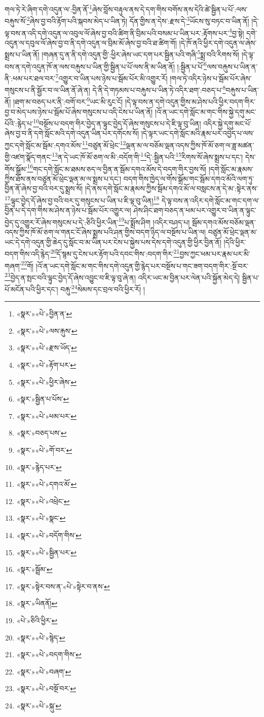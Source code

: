 གལ་ཏེ་རེ་ཞིག་དགེ་འདུན་ལ་:བྱིན་ནོ་\footnote{«སྣར་»«པེ་»བྱིན་ན་}ཞེས་བློས་བརྟུལ་ནས་དེ་དག་གིས་བགོས་ནས་དེའི་ཚེ་སྦྱིན་པ་པོ་:ལས་བརྐུས་སོ་\footnote{«སྣར་»«པེ་»ལས་རྐུས་}ཞེས་བྱ་བའི་རྟོག་པའི་སྐབས་མེད་པ་ཡིན་ཏེ། དོན་གྱིས་ན་དེས་:རྫས་དེ་\footnote{«སྣར་»«པེ་»རྫས་ཡོད་}ཡོངས་སུ་བཏང་བ་ཡིན་ནོ། །དེ་ལྟ་བས་ན་འདི་དགེ་འདུན་ལ་འབུལ་ལོ་ཞེས་བྱ་བའི་ཚིག་ནི་བྲིམ་པའི་བསམ་པ་ཡིན་པར་:རྟོགས་པར་\footnote{«སྣར་»«པེ་»རྟོག་པར་}བྱ་སྟེ། དགེ་འདུན་ལ་དབུལ་ལོ་ཞེས་བྱ་བ་ནི་དགེ་འདུན་ལ་བྲིམ་མོ་ཞེས་བྱ་བའི་ཐ་ཚིག་གོ། །དེ་ཁོ་ནའི་ཕྱིར་དགེ་འདུན་ལ་ཞེས་སྨྲས་པ་ཡིན་ནོ། །གཞན་དུ་ན་ནི་དགེ་འདུན་གྱི་:ཕྱིར་ཞེས་ཡང་དག་པར་སྦྱིན་པའི་གཞི་\footnote{«སྣར་»«པེ་»ཕྱིར་ཞེས་}སྨྲ་བའི་རིགས་སོ། །དེ་ལྟ་བས་ན་དགེ་འདུན་ཁོ་ན་ལས་བརྐུས་པ་ཡིན་གྱི་སྦྱིན་པ་པོ་ལས་ནི་མ་ཡིན་ནོ། །:སྦྱིན་པ་པོ་\footnote{«སྣར་»སྦྱིན་པ་པོས་}ལས་བརྐུས་པ་ཡིན་ན་ནི་:ཕམ་པར་ཐལ་བར་\footnote{«སྣར་»«པེ་»ཕམ་པར་}འགྱུར་བ་ཡིན་པས་ཉེས་པ་སྦོམ་པོར་མི་འགྱུར་རོ། །གལ་ཏེ་འདིར་ཉེས་པ་སྦོམ་པོར་ཞེས་གསུངས་པ་ནི་སྦྱོར་བ་ལ་ཡིན་ནོ་ཞེ་ན། དེ་ནི་དེ་གཏམས་པ་བརྐུས་པ་ཡིན་ཏེ་འདིར་ཐག་:བཅད་པ་\footnote{«སྣར་»བཅད་པས་}བརྐུས་པ་ཡིན་ནོ། །ཐག་མ་བཅད་པར་ནི་:བགོ་བར་\footnote{«སྣར་»«པེ་»གོ་བར་}ཡང་མི་རུང་ངོ། །དེ་ལྟ་བས་ན་དགེ་འདུན་གྱིས་མ་ཤེས་པའི་ཕྱིར་བདག་གིར་བྱ་བ་མེད་པས་ཉེས་པ་སྦོམ་པོ་ཞེས་གསུངས་པ་འདི་ངེས་པ་ཡིན་ནོ། །འོ་ན་ཡང་དགེ་སློང་མ་གང་གིས་སྐྱེ་དགུ་མང་པོའི་:རྙེད་པ་\footnote{«སྣར་»རྙེད་པར་}བསྔོས་པ་བདག་གིར་བྱེད་ན་ལྟུང་བྱེད་དོ་ཞེས་གསུངས་པ་དེ་ཇི་ལྟ་བུ་ཡིན། འདིར་སྐྱེ་དགུ་མང་པོ་ཞེས་བྱ་བ་ནི་དགེ་སློང་མའི་དགེ་འདུན་ཡིན་པར་དགོངས་སོ། །དེ་ལྟར་ཡང་དགེ་སློང་མའི་རྣམ་པར་འབྱེད་པ་ལས་ཀྱང་དགེ་སློང་མ་སྦོམ་:དགའ་མོས་\footnote{«སྣར་»«པེ་»དགའ་མོ་}བཙུན་མོ་ཕྲེང་\footnote{«སྣར་»«པེ་»འཕྲེང་}ལྡན་མ་ལ་བཅོམ་ལྡན་འདས་ཀྱིས་ཁོ་མོ་ཅག་ལ་ཟླ་མཚན་གྱི་འཛག་སྣོད་གནང་\footnote{«སྣར་»«པེ་»སྣང་}ན་དེ་ཡང་ཁོ་མོ་ཅག་ལ་མི་:བདོག་གི་\footnote{«སྣར་»«པེ་»བདོག་གིས་}དེ་:སྦྱིན་པའི་\footnote{«སྣར་»«པེ་»སྦྱིན་པར་}རིགས་སོ་ཞེས་སྨྲས་པ་དང་། དེས་གོས་སྒྲོམ་\footnote{«སྣར་»སྦྲོམ་}གང་དགེ་སློང་མ་ཐམས་ཅད་ལ་བྱིན་ན་སྦོམ་དགའ་མོས་དེ་བདག་གིར་བྱས་སོ། །དགེ་སློང་མ་རྣམས་ཀྱིས་ཐོས་ནས་བཙུན་མོ་ཕྲེང་ལྡན་མ་ལ་སྨྲས་པ་དང་། བདག་གིས་ཁྱེད་ལ་གོས་སྒྲོམ་གང་སྦོམ་དགའ་མོའི་ལག་ཏུ་བྱིན་ནོ་ཞེས་བྱ་བའི་བར་དུ་སྨྲས་སོ། །དེ་ནས་དགེ་སློང་མ་རྣམས་ཀྱིས་སྦོམ་དགའ་མོ་ལ་བསླངས་ན་དེ་མ་:སྟེར་ནས་\footnote{«སྣར་»སྟེར་བས་ན་«པེ་»སྟེར་བ་ནས་}ལྟུང་བྱེད་དོ་ཞེས་བྱ་བའི་བར་དུ་གསུངས་པ་ཡིན་པ་ཇི་ལྟ་བུ་ཡིན།\footnote{«སྣར་»ཡིནནོ།} དེ་ལྟ་བས་ན་འདིར་དགེ་སློང་མ་གང་དག་ལ་བྱིན་པ་དེ་དག་གིས་མ་ཤེས་ན་ཉེས་པ་སྦོམ་པོར་འགྱུར་ལ། ཤེས་ཤིང་ཐག་བཅད་ན་ཕམ་པར་འགྱུར་བ་ཡིན་ན་ལྟུང་བྱེད་དུ་འགྱུར་རོ་ཞེས་གསུངས་པ་དེ་:ཅིའི་ཕྱིར་ཡིན་\footnote{«པེ་»ཅིའི་ཕྱིར་}པ་སྨྲོས་ཤིག །འདིར་བཤད་པ། སྦོམ་དགའ་མོས་བཅོམ་ལྡན་འདས་ཀྱིས་ཁོ་མོ་ཅག་ལ་གནང་ངོ་ཞེས་སྨྲས་པའི་ཤན་གྱིས་བདག་ཉིད་ལ་བསྔོས་པ་ཡིན་ལ། བཙུན་མོ་ཕྲེང་ལྡན་མ་ཡང་དེ་དགེ་འདུན་གྱི་ཆེད་དུ་སློང་བ་མ་ཡིན་པར་ངེས་པ་སྐྱེས་པས་དེས་དགེ་འདུན་གྱི་ཕྱིར་བྱིན་ནོ། །དེའི་ཕྱིར་བདག་གིས་འདི་རྙེད་\footnote{«སྣར་»«པེ་»སྙེད་}དོ་སྙམ་དུ་ངེས་པར་རྟོག་པའི་དབང་གིས་:བདག་གིར་\footnote{«སྣར་»«པེ་»བདག་གིས་}བྱས་ཀྱང་ཕམ་པར་རྣམ་པར་མི་གཞག་\footnote{«སྣར་»«པེ་»བཞག་}གོ། །འོ་ན་ཡང་དགེ་སློང་མ་གང་གིས་དགེ་འདུན་གྱི་རྙེད་པར་བསྔོས་པ་གང་ཟག་བདག་གིར་:སྔོ་བར་\footnote{«སྣར་»«པེ་»བསྔོ་བར་}བྱེད་ན་སྤང་བའི་ལྟུང་བྱེད་དོ་ཞེས་འབྱུང་བ་ཇི་ལྟ་བུ་ཞེ་ན། འདིར་ཡང་མ་བྱིན་པར་ལེན་པའི་སྐྱོན་མེད་དེ། སྦྱིན་པ་པོ་མངོན་པའི་ཕྱིར་དང་། བརྐུ་\footnote{«སྣར་»«པེ་»སྐུ་}སེམས་དང་བྲལ་བའི་ཕྱིར་རོ། །

